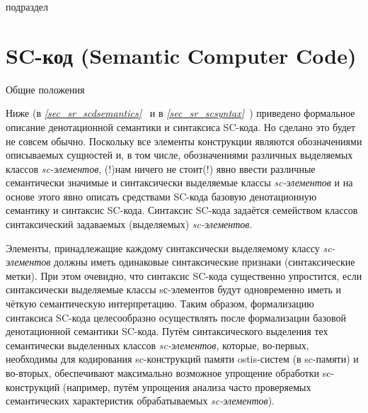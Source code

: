 
\begin{SCn}
	\begin{scnrelfromlist}{подраздел}
	\end{scnrelfromlist}
\end{SCn}


\section{SC-код (Semantic Computer Code)}
\label{sec_sr_sccode}
Общие положения

Ниже (в \textit{\ref{sec_sr_scdsemantics}~} и в \textit{\ref{sec_sr_scsyntax}~}) приведено формальное описание денотационной семантики и синтаксиса SC-кода. Но сделано это будет не совсем обычно. Поскольку все элементы конструкции являются обозначениями описываемых сущностей и, в том числе, обозначениями различных выделяемых классов \textit{sc-элементов}, (!)нам ничего не стоит(!) явно ввести различные семантически значимые и синтаксически выделяемые классы \textit{sc-элементов} и на основе этого явно описать средствами SC-кода базовую денотационную семантику и синтаксис SC-кода. Синтаксис SC-кода задаётся семейством классов синтаксический задаваемых (выделяемых) \textit{sc-элементов}. 

Элементы, принадлежащие каждому синтаксически выделяемому классу \textit{sc-элементов} должны иметь одинаковые синтаксические признаки (синтаксические метки). При этом очевидно, что синтаксис SC-кода существенно упростится, если синтаксически выделяемые классы sс-элементов будут одновременно иметь и чёткую семантическую интерпретацию. Таким образом, формализацию синтаксиса SC-кода целесообразно осуществлять после формализации базовой денотационной семантики SC-кода. Путём синтаксического выделения тех семантически выделенных классов \textit{sc-элементов}, которые, во-первых, необходимы для кодирования sc-конструкций памяти ostis-систем (в sc-памяти) и во-вторых, обеспечивают максимально возможное упрощение обработки sc-конструкций (например, путём упрощения анализа часто проверяемых семантических характеристик обрабатываемых \textit{sc-элементов}).


